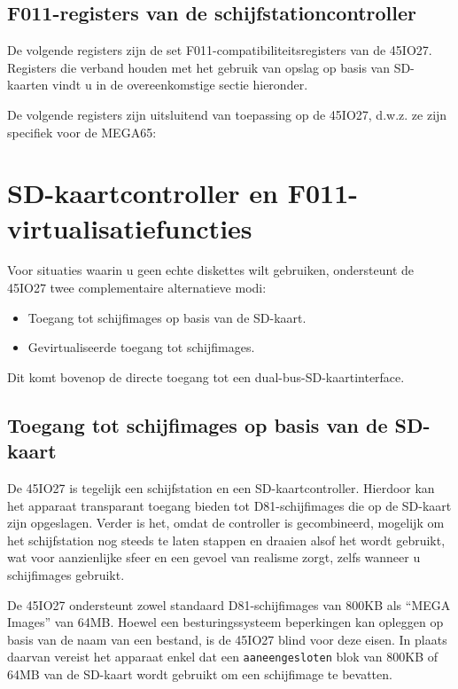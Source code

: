 \subsection{F011-registers van de schijfstationcontroller}

De volgende registers zijn de set F011-compatibiliteitsregisters van de 45IO27. Registers die verband houden met het gebruik van opslag op basis van SD-kaarten vindt u in de overeenkomstige sectie hieronder.



De volgende registers zijn uitsluitend van toepassing op de 45IO27, d.w.z. ze zijn specifiek voor de MEGA65:



\section{SD-kaartcontroller en F011-virtualisatiefuncties}

Voor situaties waarin u geen echte diskettes wilt gebruiken, ondersteunt de 45IO27 twee complementaire alternatieve modi:

\begin{itemize}
\item Toegang tot schijfimages op basis van de SD-kaart.\item Gevirtualiseerde toegang tot schijfimages.
\end{itemize}

Dit komt bovenop de directe toegang tot een dual-bus-SD-kaartinterface.

\subsection{Toegang tot schijfimages op basis van de SD-kaart}

De 45IO27 is tegelijk een schijfstation en een SD-kaartcontroller. Hierdoor kan het apparaat transparant toegang bieden tot D81-schijfimages die op de SD-kaart zijn opgeslagen. Verder is het, omdat de controller is gecombineerd, mogelijk om het schijfstation nog steeds te laten stappen en draaien alsof het wordt gebruikt, wat voor aanzienlijke sfeer en een gevoel van realisme zorgt, zelfs wanneer u schijfimages gebruikt.

De 45IO27 ondersteunt zowel standaard D81-schijfimages van 800KB als ``MEGA Images'' van 64MB. Hoewel een besturingssysteem beperkingen kan opleggen op basis van de naam van een bestand, is de 45IO27 blind voor deze eisen. In plaats daarvan vereist het apparaat enkel dat een {\tt aaneengesloten} blok van 800KB of 64MB van de SD-kaart wordt gebruikt om een schijfimage te bevatten.

